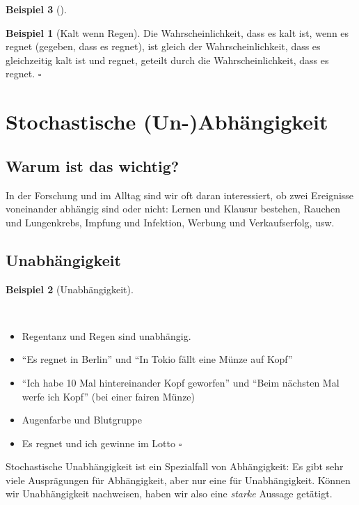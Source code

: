\documentclass[
  ngerman,
  letterpaper,
  twoside,
  open=any]{scrbook}
\providecommand{\tightlist}{%
  \setlength{\itemsep}{0pt}\setlength{\parskip}{0pt}}\usepackage{longtable,booktabs,array}
\theoremstyle{definition}
\newtheorem{example}{Beispiel}[chapter]
\theoremstyle{plain}
\theoremstyle{definition}
\theoremstyle{definition}
\theoremstyle{remark}
\begin{document}
\begin{example}[]
\begin{example}[Kalt wenn
Regen]
Die Wahrscheinlichkeit, dass es kalt ist, wenn es regnet (gegeben, dass
es regnet), ist gleich der Wahrscheinlichkeit, dass es gleichzeitig kalt
ist und regnet, geteilt durch die Wahrscheinlichkeit, dass es regnet.
\(\square\)

\end{example}

\section{Stochastische
(Un-)Abhängigkeit}\label{stochastische-un-abhuxe4ngigkeit}

\subsection{Warum ist das wichtig?}\label{warum-ist-das-wichtig}

In der Forschung und im Alltag sind wir oft daran interessiert, ob zwei
Ereignisse voneinander abhängig sind oder nicht: Lernen und Klausur
bestehen, Rauchen und Lungenkrebs, Impfung und Infektion, Werbung und
Verkaufserfolg, usw.

\subsection{Unabhängigkeit}\label{unabhuxe4ngigkeit}

\begin{example}[Unabhängigkeit]\protect\hypertarget{exm-indep-intro}{}\label{exm-indep-intro}

~

\begin{itemize}
\tightlist
\item
  Regentanz und Regen sind unabhängig.
\item
  \enquote{Es regnet in Berlin} und \enquote{In Tokio fällt eine Münze
  auf Kopf}
\item
  \enquote{Ich habe 10 Mal hintereinander Kopf geworfen} und
  \enquote{Beim nächsten Mal werfe ich Kopf} (bei einer fairen Münze)
\item
  Augenfarbe und Blutgruppe
\item
  Es regnet und ich gewinne im Lotto \(\square\)
\end{itemize}

\end{example}

Stochastische Unabhängigkeit ist ein Spezialfall von Abhängigkeit: Es
gibt sehr viele Ausprägungen für Abhängigkeit, aber nur eine für
Unabhängigkeit. Können wir Unabhängigkeit nachweisen, haben wir also
eine \emph{starke} Aussage getätigt.


\end{example}
\end{document}

